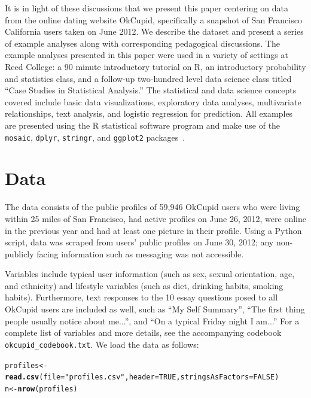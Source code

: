 \documentclass{article}\usepackage[]{graphicx}\usepackage[]{color}
\makeatletter
\newcommand{\hlnum}[1]{\textcolor[rgb]{0.686,0.059,0.569}{#1}}%
\newcommand{\hlstr}[1]{\textcolor[rgb]{0.192,0.494,0.8}{#1}}%
\newcommand{\hlstd}[1]{\textcolor[rgb]{0.345,0.345,0.345}{#1}}%
\newcommand{\hlkwb}[1]{\textcolor[rgb]{0.69,0.353,0.396}{#1}}%
\newcommand{\hlkwc}[1]{\textcolor[rgb]{0.333,0.667,0.333}{#1}}%
\newcommand{\hlkwd}[1]{\textcolor[rgb]{0.737,0.353,0.396}{\textbf{#1}}}%
\newenvironment{kframe}{%
 \def\at@end@of@kframe{}%
 \ifinner\ifhmode%
  \def\at@end@of@kframe{\end{minipage}}%
  \begin{minipage}{\columnwidth}%
 \fi\fi%
 \def\FrameCommand##1{\hskip\@totalleftmargin \hskip-\fboxsep
 \colorbox{shadecolor}{##1}\hskip-\fboxsep
     \hskip-\linewidth \hskip-\@totalleftmargin \hskip\columnwidth}%
 \MakeFramed {\advance\hsize-\width
   \@totalleftmargin\z@ \linewidth\hsize
   \@setminipage}}%
 {\par\unskip\endMakeFramed%
 \at@end@of@kframe}
\newenvironment{knitrout}{}{} %
\makeatother
\begin{document}
It is in light of these discussions that we present this paper centering on data from the online dating website OkCupid, specifically a snapshot of San Francisco California users taken on June 2012.  We describe the dataset and present a series of example analyses along with corresponding pedagogical discussions.  The example analyses presented in this paper were used in a variety of settings at Reed College: a 90 minute introductory tutorial on R, an introductory probability and statistics class, and a follow-up two-hundred level data science class titled ``Case Studies in Statistical Analysis.''  The statistical and data science concepts covered include basic data visualizations, exploratory data analyses, multivariate relationships, text analysis, and logistic regression for prediction.  All examples are presented using the R statistical software program and make use of the \verb#mosaic#, \verb#dplyr#, \verb#stringr#, and \verb#ggplot2# packages~\cite{mosaic, dplyr, stringr, ggplot2}.








%
\section{Data}
%
The data consists of the public profiles of 59,946 OkCupid users who were living within 25 miles of San Francisco, had active profiles on June 26, 2012, were online in the previous year and had at least one picture in their profile.  Using a Python script, data was scraped from users' public profiles on June 30, 2012; any non-publicly facing information such as messaging was not accessible.

Variables include typical user information (such as sex, sexual orientation, age, and ethnicity) and lifestyle variables (such as diet, drinking habits, smoking habits).  Furthermore, text responses to the 10 essay questions posed to all OkCupid users are included as well, such as ``My Self Summary'', ``The first thing people usually notice about me...'', and ``On a typical Friday night I am...''  For a complete list of variables and more details, see the accompanying codebook \verb#okcupid_codebook.txt#.  We load the data as follows:

\begin{knitrout}
\color{fgcolor}\begin{kframe}
\begin{alltt}
\hlstd{profiles} \hlkwb{<-} \hlkwd{read.csv}\hlstd{(}\hlkwc{file}\hlstd{=}\hlstr{"profiles.csv"}\hlstd{,} \hlkwc{header}\hlstd{=}\hlnum{TRUE}\hlstd{,} \hlkwc{stringsAsFactors}\hlstd{=}\hlnum{FALSE}\hlstd{)}
\hlstd{n} \hlkwb{<-} \hlkwd{nrow}\hlstd{(profiles)}
\end{alltt}
\end{kframe}
\end{knitrout}
\end{document}
